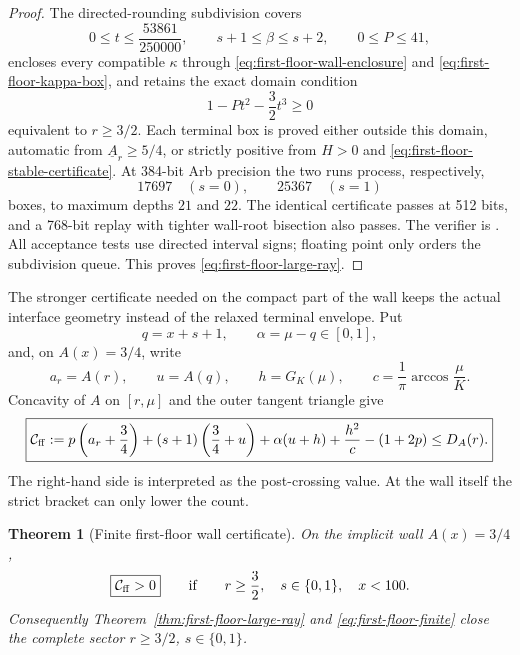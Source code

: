 \documentclass[11pt]{article}
\newtheorem{theorem}{Theorem}[section]
\theoremstyle{remark}
\begin{document}
\begin{proof}
The directed-rounding subdivision covers
\[
 0\leq t\leq\frac{53861}{250000},\qquad
 s+1\leq\beta\leq s+2,\qquad0\leq P\leq41,
\]
encloses every compatible $\kappa$ through
\eqref{eq:first-floor-wall-enclosure} and
\eqref{eq:first-floor-kappa-box}, and retains the exact domain condition
\[
 1-Pt^2-\frac32t^3\geq0
\]
equivalent to $r\geq3/2$.  Each terminal box is proved either outside this
domain, automatic from $\underline A_r\geq5/4$, or strictly positive from
$H>0$ and \eqref{eq:first-floor-stable-certificate}.  At 384-bit Arb
precision the two runs process, respectively,
\[
 17697\quad(s=0),\qquad25367\quad(s=1)
\]
boxes, to maximum depths $21$ and $22$.  The identical certificate passes
at 512 bits, and a 768-bit replay with tighter wall-root bisection also
passes.  The verifier is
.  All acceptance tests
use directed interval signs; floating point only orders the subdivision
queue.  This proves \eqref{eq:first-floor-large-ray}.
\end{proof}

The stronger certificate needed on the compact part of the wall keeps the
actual interface geometry instead of the relaxed terminal envelope.  Put
\[
 q=x+s+1,\qquad \alpha=\mu-q\in[0,1],
\]
and, on $A(x)=3/4$, write
\[
 a_r=A(r),\qquad u=A(q),\qquad h=G_K(\mu),\qquad
 c=\frac1\pi\arccos\frac\mu K.
\]
Concavity of $A$ on $[r,\mu]$ and the outer tangent triangle give
\begin{equation}
 \boxed{
 \mathcal C_{\rm ff}:=
 p\left(a_r+\frac34\right)
 +(s+1)\left(\frac34+u\right)
 +\alpha(u+h)+\frac{h^2}{c}-(1+2p)
 \leq D_A(r).}
 \label{eq:first-floor-true-certificate}
\end{equation}
The right-hand side is interpreted as the post-crossing value.  At the
wall itself the strict bracket can only lower the count.

\begin{theorem}[Finite first-floor wall certificate]
\label{thm:first-floor-finite}
On the implicit wall $A(x)=3/4$,
\begin{equation}
 \boxed{\mathcal C_{\rm ff}>0}
 \qquad\text{if}\qquad
 r\geq\frac32,\quad s\in\{0,1\},\quad x<100.
 \label{eq:first-floor-finite}
\end{equation}
Consequently Theorem~\ref{thm:first-floor-large-ray} and
\eqref{eq:first-floor-finite} close the complete sector
$r\geq3/2$, $s\in\{0,1\}$.
\end{theorem}
\end{document}
